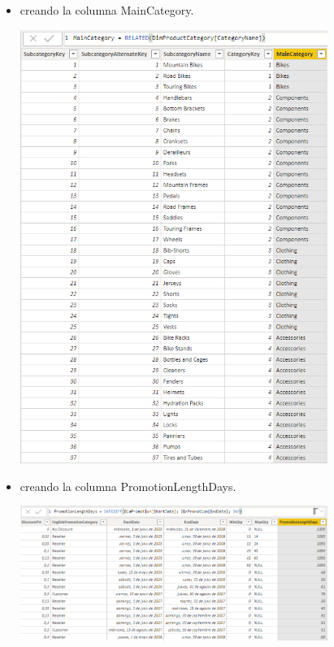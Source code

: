 \begin{itemize}
	\item creando la columna MainCategory.
	\begin{center}
	\includegraphics[width=10cm]{./Imagenes/Captura3-4} 
	\end{center}
\end{itemize}

\begin{itemize}
	\item creando la columna PromotionLengthDays.
	\begin{center}
	\includegraphics[width=10cm]{./Imagenes/Captura3-5} 
	\end{center}
\end{itemize}

